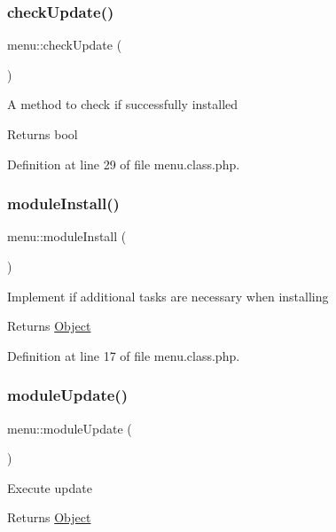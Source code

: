 \subsubsection{\texorpdfstring{check\+Update()}{checkUpdate()}}
{\footnotesize\ttfamily menu\+::check\+Update (\begin{DoxyParamCaption}{ }\end{DoxyParamCaption})}

A method to check if successfully installed \begin{DoxyReturn}{Returns}
bool 
\end{DoxyReturn}


Definition at line 29 of file menu.\+class.\+php.

\hypertarget{classmenu_ae8c300e3fc86ad4a834e489d849c69e1}{}\label{classmenu_ae8c300e3fc86ad4a834e489d849c69e1} 
\subsubsection{\texorpdfstring{module\+Install()}{moduleInstall()}}
{\footnotesize\ttfamily menu\+::module\+Install (\begin{DoxyParamCaption}{ }\end{DoxyParamCaption})}

Implement if additional tasks are necessary when installing \begin{DoxyReturn}{Returns}
\hyperlink{classObject}{Object} 
\end{DoxyReturn}


Definition at line 17 of file menu.\+class.\+php.

\hypertarget{classmenu_aa9eb9adadde15b730b887564b9184023}{}\label{classmenu_aa9eb9adadde15b730b887564b9184023} 
\subsubsection{\texorpdfstring{module\+Update()}{moduleUpdate()}}
{\footnotesize\ttfamily menu\+::module\+Update (\begin{DoxyParamCaption}{ }\end{DoxyParamCaption})}

Execute update \begin{DoxyReturn}{Returns}
\hyperlink{classObject}{Object} 
\end{DoxyReturn}


